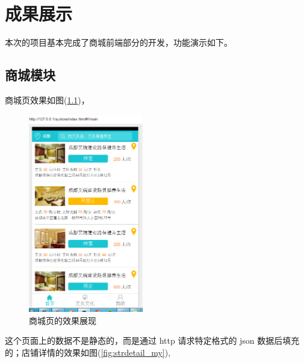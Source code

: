 \chapter{成果展示}
  \label{chap:成果展示}
    本次的项目基本完成了商城前端部分的开发，功能演示如下。
    \section{商城模块}
      \label{sec:商城模块}
        商城页效果如图(\ref{fig:home_my})，
        \begin{figure}[htbp]
          \centering
          \includegraphics[width=5cm]{./img/home_my.png}
          \caption{商城页的效果展现}
          \label{fig:home_my}
        \end{figure}
        这个页面上的数据不是静态的，而是通过 http 请求特定格式的 json 数据后填充的；店铺详情的效果如图(\ref{fig:strdetail_my}),
